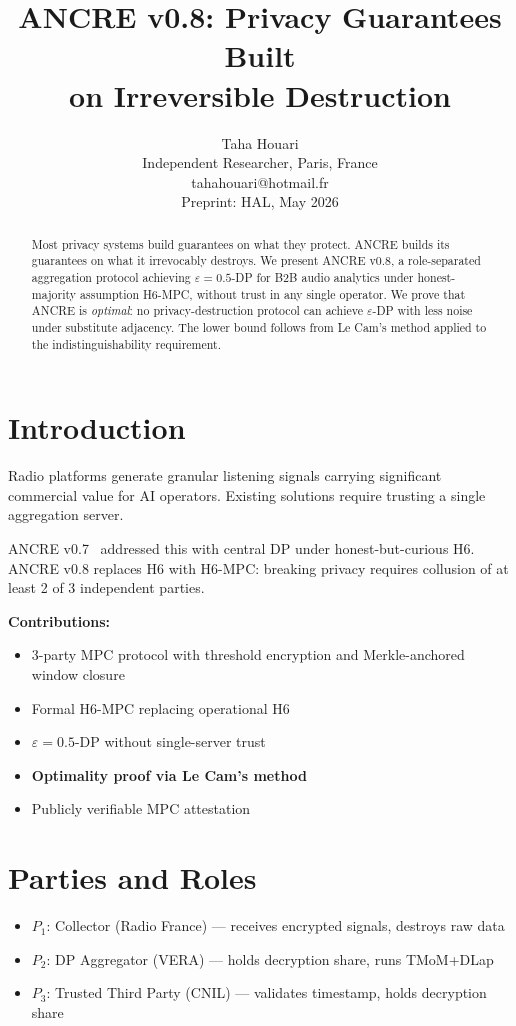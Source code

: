 \documentclass{article}
\title{ANCRE v0.8: Privacy Guarantees Built\\
on Irreversible Destruction}
\author{Taha Houari\\
Independent Researcher, Paris, France\\
tahahouari@hotmail.fr\\
Preprint: HAL, May 2026}
\begin{document}
\maketitle

\begin{abstract}
Most privacy systems build guarantees on what
they protect. ANCRE builds its guarantees on
what it irrevocably destroys. We present ANCRE
v0.8, a role-separated aggregation protocol achieving
$\varepsilon=0.5$-DP for B2B audio analytics
under honest-majority assumption H6-MPC,
without trust in any single operator.
We prove that ANCRE is \emph{optimal}:
no privacy-destruction protocol can achieve
$\varepsilon$-DP with less noise under
substitute adjacency. The lower bound follows
from Le Cam's method applied to the
indistinguishability requirement.
\end{abstract}

\section{Introduction}
Radio platforms generate granular listening
signals carrying significant commercial value
for AI operators. Existing solutions require
trusting a single aggregation server.

ANCRE v0.7~\cite{houari2026ancre} addressed
this with central DP under honest-but-curious
H6. ANCRE v0.8 replaces H6 with H6-MPC:
breaking privacy requires collusion of
at least 2 of 3 independent parties.

\textbf{Contributions:}
\begin{itemize}
\item 3-party MPC protocol with threshold
      encryption and Merkle-anchored window closure
\item Formal H6-MPC replacing operational H6
\item $\varepsilon=0.5$-DP without single-server trust
\item \textbf{Optimality proof via Le Cam's method}
\item Publicly verifiable MPC attestation
\end{itemize}

\section{Parties and Roles}
\begin{itemize}
\item $P_1$: Collector (Radio France) ---
      receives encrypted signals, destroys raw data
\item $P_2$: DP Aggregator (VERA) ---
      holds decryption share, runs TMoM+DLap
\item $P_3$: Trusted Third Party (CNIL) ---
      validates timestamp, holds decryption share
\end{itemize}
\end{document}
